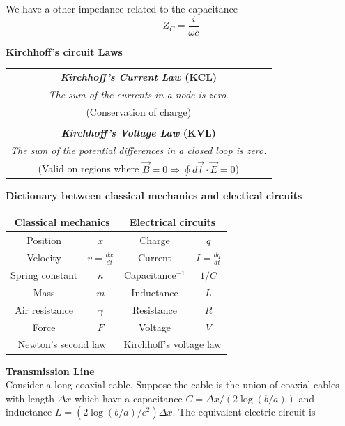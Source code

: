 \documentclass[12pt,a4paper]{article}
\begin{document}
We have a other impedance related to the capacitance
\begin{equation}
	Z_C = \frac{i}{\omega c}
\end{equation}

\textbf{Kirchhoff's circuit Laws}\\
\begin{center}
\begin{tabular}{c}
\textbf{\textit{Kirchhoff's Current Law} (KCL)} \\
\textit{The sum of the currents in a node is zero}. \\
(Conservation of charge) \\
 \\
\textbf{\textit{Kirchhoff's Voltage Law} (KVL)} \\
\textit{The sum of the potential differences in a closed loop is zero.}\\
(Valid on regions where $\vec{B} = 0 \Rightarrow\oint d\vec{l}\cdot \vec{E}=0$) \\
\end{tabular}
\end{center}
\textbf{Dictionary between classical mechanics and electical circuits}
\begin{center}
\begin{tabular}{|cc|cc|}
\hline
\multicolumn{2}{|c|}{\textbf{Classical mechanics}} & \multicolumn{2}{c|}{\textbf{Electrical circuits}} \\
\hline
Position  & $x$ & Charge & $q$ \\
\hline
Velocity & $v = \frac{dx}{dt}$ & Current & $I=\frac{dq}{dt}$ \\
\hline
Spring constant & $\kappa$ & Capacitance$^{-1}$ & $1/C$ \\
\hline
Mass & $m$ & Inductance & $L$ \\
\hline
Air resistance & $\gamma$ & Resistance & $R$  \\
\hline
Force & $F$ & Voltage & $V$ \\ \hline
\multicolumn{2}{|c}{Newton's second law} & \multicolumn{2}{|c|}{Kirchhoff's voltage law} \\
\hline
\end{tabular}

\end{center}
\textbf{Transmission Line}\\
Consider a long coaxial cable. Suppose the cable is the union of coaxial cables with length $\Delta x$ which have a capacitance $C = \Delta x / (2\log(b/a))$ and inductance $L = (2\log(b/a)/c^2) \Delta x$. The equivalent electric circuit is
\end{document}
